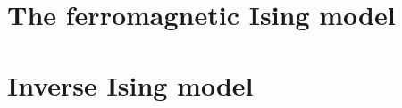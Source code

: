 \documentclass[handout]{beamer}
\begin{document}
\section{The ferromagnetic Ising model}

\section{Inverse Ising model}
\end{document}

